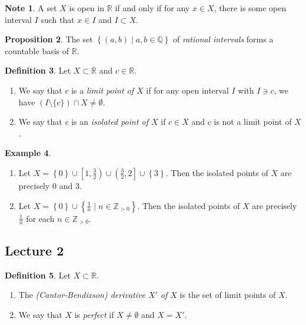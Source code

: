 \documentclass[10pt,letterpaper,cm]{nupset}
\theoremstyle{definition}
\newtheorem{definition}{Definition}[subsection]
\newtheorem{exmp}[definition]{Example}
\newtheorem{note}[definition]{Note}
\theoremstyle{theorem}
\newtheorem{prop}[definition]{Proposition}
\theoremstyle{remark}
\newcommand{\Q}{\mathbb Q}
\newcommand{\R}{\mathbb R}
\newcommand{\Z}{\mathbb Z}
\newcommand{\1}{\mathbf{1}}
\newcommand{\0}{\vec 0}
\begin{document}
\begin{note}
A set $X$ is open in $\R$ if and only if for any $x\in X$, there is some open interval $I$ such that  $x\in I$ and $I \subset X$.  
\end{note}

\begin{prop}
The set $\left\{\left(a,b\right) \mid a, b\in \Q\right\}$ of \textit{rational intervals} forms a countable basis of $\R$.
\end{prop}

\begin{definition} Let $X\subset \R$ and $c\in \R$.
\begin{enumerate}
\item We say that $c$ is a \textit{limit point of $X$} if for any open interval $I$ with $I\ni c$, we have $\left(I\setminus \{c\}\right) \cap X \ne \emptyset$.
\item We say that $c$ is an \textit{isolated point of $X$} if $c\in X$ and $c$ is not a limit point of $X$.
\end{enumerate}
\end{definition}

\begin{exmp} $ $
\begin{enumerate}
\item Let $X = \left\{0\right\} \cup \left[1, \frac{3}{2}\right) \cup \left(\frac{3}{2}, 2\right] \cup \left\{3\right\}$. Then the isolated points of $X$ are precisely $0$ and $3$. 
\item Let $X = \left\{0\right\} \cup \left\{\frac{1}{n} \mid n \in \Z_{>0}\right\}$. Then the isolated points of $X$ are precisely $\frac{1}{n}$ for each $n\in \Z_{>0}$.
\end{enumerate}
\end{exmp}

\subsection{Lecture 2}

\begin{definition} Let $X\subset \R$. 
\begin{enumerate} 
\item The \textit{(Cantor-Bendixson) derivative $X'$ of $X$} is the set of limit points of $X$. 
\item We say that $X$ is \textit{perfect} if $X \ne \emptyset$ and $X = X'$.
\end{enumerate}
\end{definition}
\end{document}
